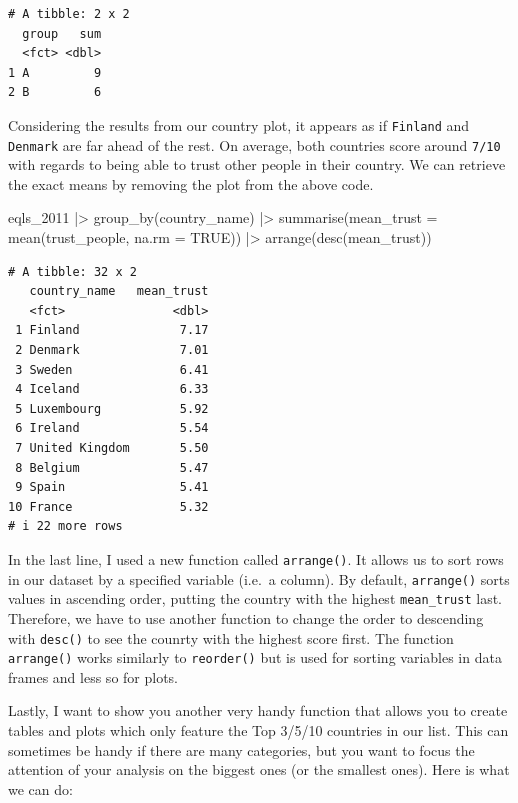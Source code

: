 \documentclass[
  letterpaper,
  DIV=11,
  numbers=noendperiod]{scrreprt}
\newenvironment{Shaded}{\begin{snugshade}}{\end{snugshade}}
\newcommand{\AttributeTok}[1]{\textcolor[rgb]{0.40,0.45,0.13}{#1}}
\newcommand{\ConstantTok}[1]{\textcolor[rgb]{0.56,0.35,0.01}{#1}}
\newcommand{\FunctionTok}[1]{\textcolor[rgb]{0.28,0.35,0.67}{#1}}
\newcommand{\NormalTok}[1]{\textcolor[rgb]{0.00,0.23,0.31}{#1}}
\newcommand{\SpecialCharTok}[1]{\textcolor[rgb]{0.37,0.37,0.37}{#1}}
\begin{document}
\begin{verbatim}
# A tibble: 2 x 2
  group   sum
  <fct> <dbl>
1 A         9
2 B         6
\end{verbatim}

Considering the results from our country plot, it appears as if
\texttt{Finland} and \texttt{Denmark} are far ahead of the rest. On
average, both countries score around \texttt{7/10} with regards to being
able to trust other people in their country. We can retrieve the exact
means by removing the plot from the above code.

\begin{Shaded}
\begin{Highlighting}[]
\NormalTok{eqls\_2011 }\SpecialCharTok{|\textgreater{}}
  \FunctionTok{group\_by}\NormalTok{(country\_name) }\SpecialCharTok{|\textgreater{}}
  \FunctionTok{summarise}\NormalTok{(}\AttributeTok{mean\_trust =} \FunctionTok{mean}\NormalTok{(trust\_people, }\AttributeTok{na.rm =} \ConstantTok{TRUE}\NormalTok{)) }\SpecialCharTok{|\textgreater{}}
  \FunctionTok{arrange}\NormalTok{(}\FunctionTok{desc}\NormalTok{(mean\_trust))}
\end{Highlighting}
\end{Shaded}

\begin{verbatim}
# A tibble: 32 x 2
   country_name   mean_trust
   <fct>               <dbl>
 1 Finland              7.17
 2 Denmark              7.01
 3 Sweden               6.41
 4 Iceland              6.33
 5 Luxembourg           5.92
 6 Ireland              5.54
 7 United Kingdom       5.50
 8 Belgium              5.47
 9 Spain                5.41
10 France               5.32
# i 22 more rows
\end{verbatim}

In the last line, I used a new function called \texttt{arrange()}. It
allows us to sort rows in our dataset by a specified variable (i.e.~a
column). By default, \texttt{arrange()} sorts values in ascending order,
putting the country with the highest \texttt{mean\_trust} last.
Therefore, we have to use another function to change the order to
descending with \texttt{desc()} to see the counrty with the highest
score first. The function \texttt{arrange()} works similarly to
\texttt{reorder()} but is used for sorting variables in data frames and
less so for plots.

Lastly, I want to show you another very handy function that allows you
to create tables and plots which only feature the Top 3/5/10 countries
in our list. This can sometimes be handy if there are many categories,
but you want to focus the attention of your analysis on the biggest ones
(or the smallest ones). Here is what we can do:
\end{document}
